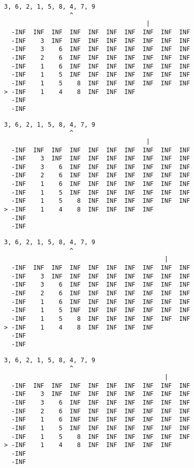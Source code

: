 { \begin{verbatim}
3, 6, 2, 1, 5, 8, 4, 7, 9
                  ^
                                       |
  -INF  INF  INF  INF  INF  INF  INF  INF  INF  INF
  -INF    3  INF  INF  INF  INF  INF  INF  INF  INF
  -INF    3    6  INF  INF  INF  INF  INF  INF  INF
  -INF    2    6  INF  INF  INF  INF  INF  INF  INF
  -INF    1    6  INF  INF  INF  INF  INF  INF  INF
  -INF    1    5  INF  INF  INF  INF  INF  INF  INF
  -INF    1    5    8  INF  INF  INF  INF  INF  INF
> -INF    1    4    8  INF  INF  INF               
  -INF                                             
  -INF                                             
\end{verbatim} }

{ \begin{verbatim}
3, 6, 2, 1, 5, 8, 4, 7, 9
                  ^
                                       |
  -INF  INF  INF  INF  INF  INF  INF  INF  INF  INF
  -INF    3  INF  INF  INF  INF  INF  INF  INF  INF
  -INF    3    6  INF  INF  INF  INF  INF  INF  INF
  -INF    2    6  INF  INF  INF  INF  INF  INF  INF
  -INF    1    6  INF  INF  INF  INF  INF  INF  INF
  -INF    1    5  INF  INF  INF  INF  INF  INF  INF
  -INF    1    5    8  INF  INF  INF  INF  INF  INF
> -INF    1    4    8  INF  INF  INF  INF          
  -INF                                             
  -INF                                             
\end{verbatim} }

{ \begin{verbatim}
3, 6, 2, 1, 5, 8, 4, 7, 9
                  ^
                                            |
  -INF  INF  INF  INF  INF  INF  INF  INF  INF  INF
  -INF    3  INF  INF  INF  INF  INF  INF  INF  INF
  -INF    3    6  INF  INF  INF  INF  INF  INF  INF
  -INF    2    6  INF  INF  INF  INF  INF  INF  INF
  -INF    1    6  INF  INF  INF  INF  INF  INF  INF
  -INF    1    5  INF  INF  INF  INF  INF  INF  INF
  -INF    1    5    8  INF  INF  INF  INF  INF  INF
> -INF    1    4    8  INF  INF  INF  INF          
  -INF                                             
  -INF                                             
\end{verbatim} }

{ \begin{verbatim}
3, 6, 2, 1, 5, 8, 4, 7, 9
                  ^
                                            |
  -INF  INF  INF  INF  INF  INF  INF  INF  INF  INF
  -INF    3  INF  INF  INF  INF  INF  INF  INF  INF
  -INF    3    6  INF  INF  INF  INF  INF  INF  INF
  -INF    2    6  INF  INF  INF  INF  INF  INF  INF
  -INF    1    6  INF  INF  INF  INF  INF  INF  INF
  -INF    1    5  INF  INF  INF  INF  INF  INF  INF
  -INF    1    5    8  INF  INF  INF  INF  INF  INF
> -INF    1    4    8  INF  INF  INF  INF  INF     
  -INF                                             
  -INF                                             
\end{verbatim} }

